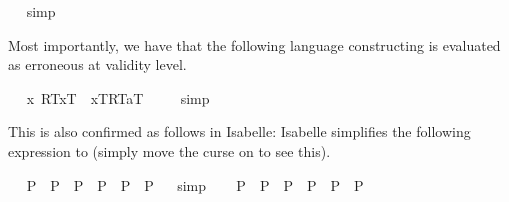 \begin{isabellebody}
\isadelimproof
\ %
\endisadelimproof
%
\isatagproof
{}\isamarkupfalse%
\ simp\ \isamarkupfalse%
%
\endisatagproof
{\isafoldproof}%
%
\isadelimproof
%
\endisadelimproof
%
\begin{isamarkuptext}%
Most importantly, we have that the following language constructing is evaluated as erroneous at validity
  level.%
\end{isamarkuptext}%
\isamarkuptrue%
\ \isamarkupfalse%
\ {\isachardoublequoteopen}{\isacharbrackleft}{\isasymlparr}\isactrlbold {\isasymlambda}x{\isachardot}\ {\isasymlparr}R\isactrlsup T{\isacharcomma}x\isactrlsup T{\isasymrparr}\ \isactrlbold {\isasymrightarrow}\ {\isasymlbrace}x\isactrlsup T{\isacharcomma}R\isactrlsup T{\isasymrbrace}{\isacharcomma}a\isactrlsup T{\isasymrparr}{\isacharbrackright}\ {\isacharequal}\ {\isacharasterisk}{\isachardoublequoteclose}%
\isadelimproof
\ %
\endisadelimproof
%
\isatagproof
{}\isamarkupfalse%
\ simp\ \isamarkupfalse%
%
\endisatagproof
{\isafoldproof}%
%
\isadelimproof
%
\endisadelimproof
%
\begin{isamarkuptext}%
This is also confirmed as follows in Isabelle: Isabelle simplifies the following expression
  to  (simply move the curse on  to see this).%
\end{isamarkuptext}%
\isamarkuptrue%
%
\isamarkuptrue%
\ \isamarkupfalse%
\ {\isachardoublequoteopen}{\isasymphi}\isactrlsup P\ \isactrlbold {\isasymand}\ {\isasympsi}\isactrlsup P\ \isactrlbold {\isasymrightarrow}\ {\isasymchi}\isactrlsup P\ {\isasymequiv}\ {\isacharparenleft}{\isasymphi}\isactrlsup P\ \isactrlbold {\isasymand}\ {\isasympsi}\isactrlsup P{\isacharparenright}\ \isactrlbold {\isasymrightarrow}\ {\isasymchi}\isactrlsup P{\isachardoublequoteclose}%
\isadelimproof
\ %
\endisadelimproof
%
\isatagproof
{}\isamarkupfalse%
\ simp\ \isamarkupfalse%
%
\endisatagproof
{\isafoldproof}%
%
\isadelimproof
%
\endisadelimproof
\isanewline
\ \isamarkupfalse%
\ {\isachardoublequoteopen}{\isasymphi}\isactrlsup P\ \isactrlbold {\isasymand}\ {\isasympsi}\isactrlsup P\ \isactrlbold {\isasymrightarrow}\ {\isasymchi}\isactrlsup P\ {\isasymequiv}\ {\isasymphi}\isactrlsup P\ \isactrlbold {\isasymand}\ {\isacharparenleft}{\isasympsi}\isactrlsup P\ \isactrlbold {\isasymrightarrow}\ {\isasymchi}\isactrlsup P{\isacharparenright}{\isachardoublequoteclose}%
\isadelimproof

\end{isabellebody}
